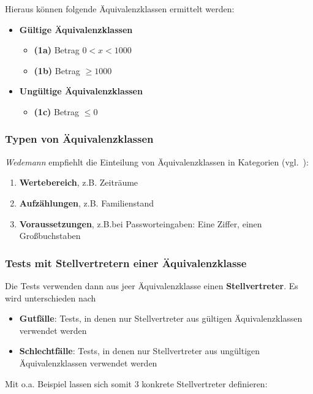 Hieraus können folgende Äquivalenzklassen ermittelt werden:

\begin{itemize}
    \item \textbf{Gültige Äquivalenzklassen}
    \begin{itemize}
        \item[] \textbf{(1a)} Betrag $0 < x < 1000 $
        \item[] \textbf{(1b)} Betrag $\geq 1000 $
    \end{itemize}
    \item \textbf{Ungültige Äquivalenzklassen}
    \begin{itemize}
      \item[] \textbf{(1c)} Betrag $\leq 0 $
    \end{itemize}
\end{itemize}

\subsubsection*{Typen von Äquivalenzklassen}
\textit{Wedemann} empfiehlt die Einteilung von Äquivalenzklassen in Kategorien (vgl.~\cite[43]{Wed09c}):

\begin{enumerate}
    \item \textbf{Wertebereich}, z.B. Zeiträume
    \item \textbf{Aufzählungen}, z.B. Familienstand
    \item \textbf{Voraussetzungen}, z.B.bei Passworteingaben: Eine Ziffer, einen Großbuchstaben
\end{enumerate}

\subsubsection*{Tests mit Stellvertretern einer Äquivalenzklasse}
Die Tests verwenden dann aus jeer Äquivalenzklasse einen \textbf{Stellvertreter}.
Es wird unterschieden nach

\begin{itemize}
    \item \textbf{Gutfälle}: Tests, in denen nur Stellvertreter aus gültigen Äquivalenzklassen verwendet werden
    \item \textbf{Schlechtfälle}: Tests, in denen nur Stellvertreter aus ungültigen Äquivalenzklassen verwendet werden
\end{itemize}

\noindent
Mit o.a. Beispiel lassen sich somit 3 konkrete Stellvertreter definieren:


